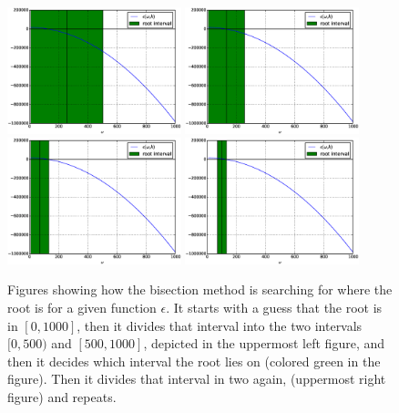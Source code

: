 \documentclass[x11names]{article}
\begin{document}
  \begin{figure}
  \centering
    \includegraphics[width = 0.45\textwidth]{../figures/bisection_100_0}
    \includegraphics[width = 0.45\textwidth]{../figures/bisection_100_1}
    \includegraphics[width = 0.45\textwidth]{../figures/bisection_100_2}
    \includegraphics[width = 0.45\textwidth]{../figures/bisection_100_3}
    \caption{Figures showing how the bisection method is searching for where the root is for a given function \(\epsilon\). It starts with a guess that the root is in \([0,1000]\), then it divides that interval into the two intervals \([0,500)\) and \([500,1000]\), depicted in the uppermost left figure, and then it decides which interval the root lies on (colored green in the figure). Then it divides that interval in two again, (uppermost right figure) and repeats.}
  \end{figure}
\end{document}
